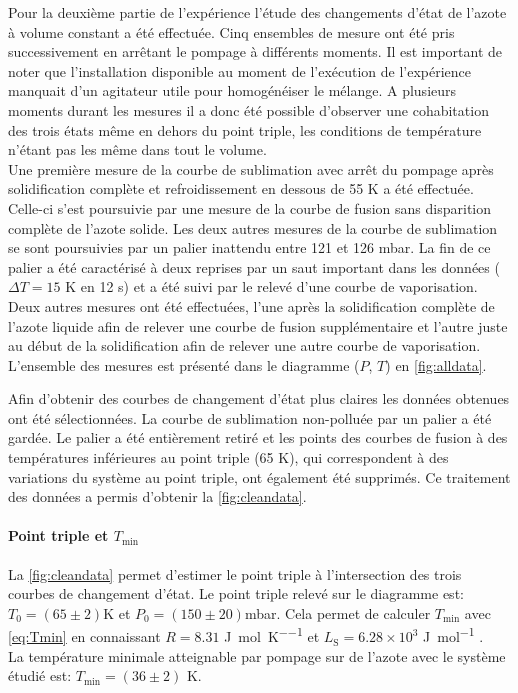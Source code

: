 Pour la deuxième partie de l'expérience l'étude des changements d'état de l'azote à volume constant a été effectuée. Cinq ensembles de mesure ont été pris successivement en arrêtant le pompage à différents moments. Il est important de noter que l'installation disponible au moment de l'exécution de l'expérience manquait d'un agitateur utile pour homogénéiser le mélange. A plusieurs moments durant les mesures il a donc été possible d'observer une cohabitation des trois états même en dehors du point triple, les conditions de température n'étant pas les même dans tout le volume. \\
Une première mesure de la courbe de sublimation avec arrêt du pompage après solidification complète et refroidissement en dessous de 55 \si{\kelvin} a été effectuée. Celle-ci s'est poursuivie par une mesure de la courbe de fusion sans disparition complète de l'azote solide. Les deux autres mesures de la courbe de sublimation se sont poursuivies par un palier inattendu entre 121 et 126 \si{\milli \bar}. La fin de ce palier a été caractérisé à deux reprises par un saut important dans les données (\(\Delta T = 15\) \si{\kelvin} en 12 \si{\second}) et a été suivi par le relevé d'une courbe de vaporisation. Deux autres mesures ont été effectuées, l'une après la solidification complète de l'azote liquide afin de relever une courbe de fusion supplémentaire et l'autre juste au début de la solidification afin de relever une autre courbe de vaporisation. L'ensemble des mesures est présenté dans le diagramme (\(P\), \(T\)) en \autoref{fig:alldata}.

Afin d'obtenir des courbes de changement d'état plus claires les données obtenues ont été sélectionnées. La courbe de sublimation non-polluée par un palier a été gardée. Le palier a été entièrement retiré et les points des courbes de fusion à des températures inférieures au point triple (65 \si{\kelvin}), qui correspondent à des variations du système au point triple, ont également été supprimés. Ce traitement des données a permis d'obtenir la \autoref{fig:cleandata}.

\paragraph*{Point triple et \(T_\textrm{min}\)}
La \autoref{fig:cleandata} permet d'estimer le point triple à l'intersection des trois courbes de changement d'état. Le point triple relevé sur le diagramme est: \(T_\textrm{0} = (65 \pm 2)\)\si{\kelvin} et \(P_\textrm{0} = (150 \pm 20)\)\si{\milli \bar}. Cela permet de calculer \(T_\textrm{min}\) avec \autoref{eq:Tmin} en connaissant \(R = 8.31\) \si{\joule \per \mole \per \kelvin} et \(L_\textrm{S} = 6.28 \times 10^{3}\) \si{\joule \per \mole} \cite{Azote}.\\
La température minimale atteignable par pompage sur de l'azote avec le système étudié est: \(T_\textrm{min} = (36 \pm 2) \) \si{\kelvin}.


